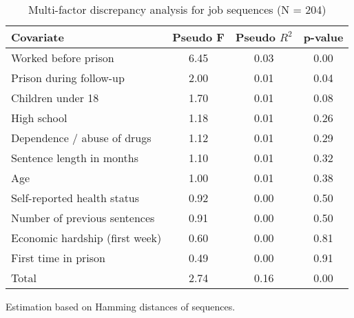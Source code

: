 \begin{table}[htp]
\footnotesize
\setlength{\tabcolsep}{10pt}
\renewcommand{\arraystretch}{1.3}
\begin{threeparttable}
\centering
\caption{Multi-factor discrepancy analysis for job sequences (N = 204)} 
\label{tab:discrepancy_job}
\begin{tabular}{lccc}
  \hline
Covariate & Pseudo F & Pseudo $R^2$ & p-value \\ 
  \hline
Worked before prison & 6.45 & 0.03 & 0.00 \\ 
  Prison during follow-up & 2.00 & 0.01 & 0.04 \\ 
  Children under 18 & 1.70 & 0.01 & 0.08 \\ 
  High school & 1.18 & 0.01 & 0.26 \\ 
  Dependence / abuse of drugs & 1.12 & 0.01 & 0.29 \\ 
  Sentence length in months & 1.10 & 0.01 & 0.32 \\ 
  Age & 1.00 & 0.01 & 0.38 \\ 
  Self-reported health status & 0.92 & 0.00 & 0.50 \\ 
  Number of previous sentences & 0.91 & 0.00 & 0.50 \\ 
  Economic hardship (first week) & 0.60 & 0.00 & 0.81 \\ 
  First time in prison & 0.49 & 0.00 & 0.91 \\ 
  Total & 2.74 & 0.16 & 0.00 \\ 
   \hline
\end{tabular}
\begin{tablenotes}
\scriptsize
\item Estimation based on Hamming distances of sequences.
\end{tablenotes}
\end{threeparttable}
\end{table}
